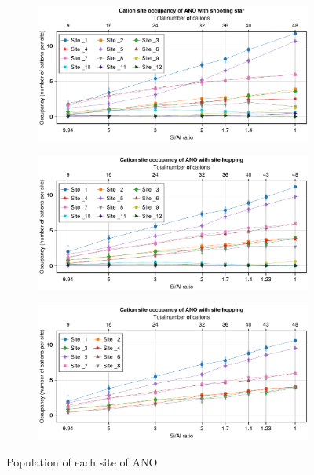 \documentclass[main.tex]{subfiles}
\begin{document}
\begin{figure}
	\centering
	\begin{subfigure}{0.95\linewidth}
		\centering
		\includegraphics[width=\linewidth]{figures/cations/ANO.pdf}
	\end{subfigure}

	\begin{subfigure}{0.95\linewidth}
		\centering
		\includegraphics[width=\linewidth]{figures/cations/ANO_sitehopping.pdf}
		\label{fig:ANO_sites12}
	\end{subfigure}

	\begin{subfigure}{0.95\linewidth}
		\centering
		\includegraphics[width=\linewidth]{figures/cations/ANO_sitehopping_sites8.pdf}
		\label{fig:ANO_sites8}
	\end{subfigure}

	\caption{Population of each site of ANO}\label{fig:ANO}
\end{figure}
\end{document}

